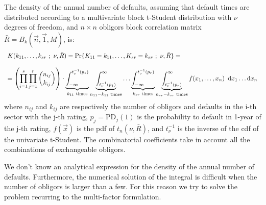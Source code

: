 \documentclass[11pt,fleqn]{book} %
\begin{document}
\begin{proposition}
	The density of the annual number of defaults, assuming that default 
	times are distributed according to a multivariate block t-Student distribution
	with $\nu$ degrees of freedom, and $n {\times} n$ obligors block correlation 
	matrix $\bar{R} = B_k(\vec{n},\vec{1},M)$, is:
	\begin{displaymath}
		\begin{array}{l}
			K(k_{11},\dots,k_{sr}\ ;\ \nu, \bar{R}) = 
			\Pr\{K_{11}=k_{11},\dots,K_{sr}=k_{sr}\ ;\ \nu, \bar{R}\} = \\
			\\
			= \left( \displaystyle \prod_{i=1}^s \prod_{j=1}^r \binom{n_{ij}}{k_{ij}} \right) \cdot       
			\displaystyle                                                                                 
			\underbrace{\int_{-\infty}^{t_{\nu}^{-1}(p_1)}}_{k_{11} \text{ times}}                        
			\underbrace{\int_{t_{\nu}^{-1}(p_1)}^{\infty}}_{n_{11}-k_{11} \text{ times}}                  
			\dots                                                                                         
			\underbrace{\int_{-\infty}^{t_{\nu}^{-1}(p_r)}}_{k_{sr} \text{ times}}                        
			\underbrace{\int_{t_{\nu}^{-1}(p_r)}^{\infty}}_{n_{sr}-k_{sr} \text{ times}}                  
			f(x_1,\dots,x_n)\ \mathop{\mathrm{{}d}}\mathopen{} x_1 \dots \mathop{\mathrm{{}d}}\mathopen{} x_n                                                        
		\end{array}
	\end{displaymath}
	where $n_{ij}$ and $k_{ij}$ are respectively the number of obligors and 
	defaults in the i-th sector with the j-th rating, $p_j = \text{PD}_j(1)$ 
	is the probability to default in 1-year of the j-th rating, $f(\vec{x})$ 
	is the pdf of $t_n(\nu,\bar{R})$, and $t_{\nu}^{-1}$ is the inverse of the 
	cdf of the univariate t-Student. The combinatorial coefficients take in 
	account all the combinations of exchangeable obligors.
\end{proposition}

We don't know an analytical expression for the density of the annual number 
of defaults. Furthermore, the numerical solution of the integral is difficult 
when the number of obligors is larger than a few. For this reason we try 
to solve the problem recurring to the multi-factor formulation.
\end{document}
